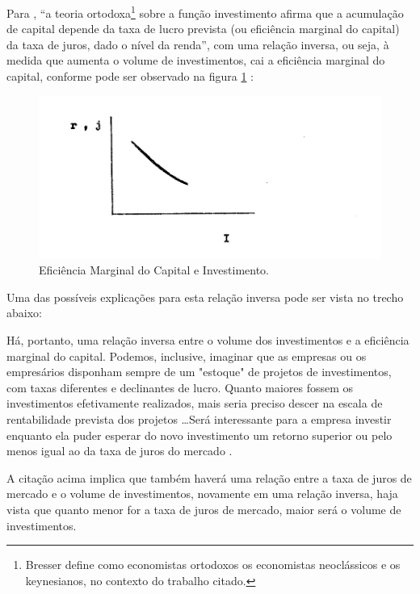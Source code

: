 \documentclass[
	12pt,				%
	oneside,			%
	a4paper,			%
	chapter=TITLE,		%
	section=TITLE,		%
	english,			%
	brazil				%
	]{abntex2}
\begin{document}
Para \textcite{Bresser-Pereira1973}, ``a teoria ortodoxa\footnote{Bresser define como economistas ortodoxos os economistas neoclássicos e os
  keynesianos, no contexto do trabalho citado.} sobre a função investimento
afirma que a acumulação de capital depende da taxa de lucro prevista (ou
eficiência marginal do capital) da taxa de juros, dado o nível da renda'', com
uma relação inversa, ou seja, à medida que aumenta o volume de investimentos,
cai a eficiência marginal do capital, conforme pode ser observado na
figura \ref{fig:eficienciamarginal} \autocite[4]{Bresser-Pereira1973}:
\begin{figure}[H]

{\centering \includegraphics[width=0.8\linewidth]{images/Page-4-Image-1} 

}

\caption{Eficiência Marginal do Capital e Investimento.}\label{fig:eficienciamarginal}
\end{figure}
Uma das possíveis explicações para esta relação inversa pode ser vista no trecho
abaixo:
\begin{citacao}
Há, portanto, uma relação inversa entre o volume dos investimentos e a
eficiência marginal do capital. Podemos, inclusive, imaginar que as empresas ou
os empresários disponham sempre de um "estoque" de projetos de investimentos,
com taxas diferentes e declinantes de lucro. Quanto maiores fossem os
investimentos efetivamente realizados, mais seria preciso descer na escala de
rentabilidade prevista dos projetos \ldots Será interessante para a empresa
investir enquanto ela puder esperar do novo investimento um retorno superior ou
pelo menos igual ao da taxa de juros do mercado
\cite[p.~5]{Bresser-Pereira1973}.
\end{citacao}
A citação acima implica que também haverá uma relação entre a taxa de juros de
mercado e o volume de investimentos, novamente em uma relação inversa, haja
vista que quanto menor for a taxa de juros de mercado, maior será o volume de
investimentos.
\end{document}
